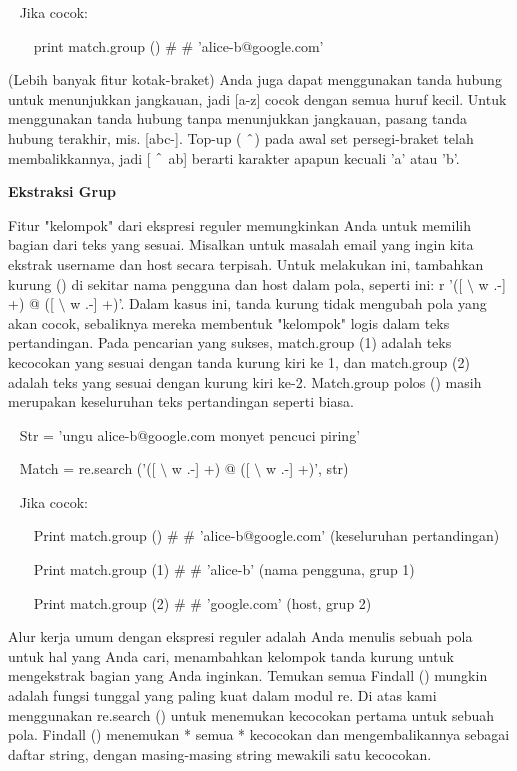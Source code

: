 \begin {enumerate}
\begin {enumerate}
\noindent
~ Jika cocok: \par
\noindent
~~~ print match.group ()  $  \#  $ $  \#  $ 'alice-b@google.com' \par
\vspace{12pt}
(Lebih banyak fitur kotak-braket) Anda juga dapat menggunakan tanda hubung untuk menunjukkan jangkauan, jadi [a-z] cocok dengan semua huruf kecil. Untuk menggunakan tanda hubung tanpa menunjukkan jangkauan, pasang tanda hubung terakhir, mis. [abc-]. Top-up ( $  \string^  $) pada awal set persegi-braket telah membalikkannya, jadi [ $  \string^  $ ab] berarti karakter apapun kecuali 'a' atau 'b'. \par
\vspace{16pt}
{\fontsize{14pt}{14pt}\selectfont \textbf{Ekstraksi Grup} \\} \par
Fitur "kelompok" dari ekspresi reguler memungkinkan Anda untuk memilih bagian dari teks yang sesuai. Misalkan untuk masalah email yang ingin kita ekstrak username dan host secara terpisah. Untuk melakukan ini, tambahkan kurung () di sekitar nama pengguna dan host dalam pola, seperti ini: r '([ $  \setminus  $ w .-] +) @ ([ $  \setminus  $ w .-] +)'. Dalam kasus ini, tanda kurung tidak mengubah pola yang akan cocok, sebaliknya mereka membentuk "kelompok" logis dalam teks pertandingan. Pada pencarian yang sukses, match.group (1) adalah teks kecocokan yang sesuai dengan tanda kurung kiri ke 1, dan match.group (2) adalah teks yang sesuai dengan kurung kiri ke-2. Match.group polos () masih merupakan keseluruhan teks pertandingan seperti biasa. \par
\vspace{12pt}
\noindent
~ Str = 'ungu alice-b@google.com monyet pencuci piring' \par
\noindent
~ Match = re.search ('([ $  \setminus  $ w .-] +) @ ([ $  \setminus  $ w .-] +)', str) \par
\noindent
~ Jika cocok: \par
\noindent
~~~ Print match.group ()  $  \#  $ $  \#  $ 'alice-b@google.com' (keseluruhan pertandingan) \par
\noindent
~~~ Print match.group (1)  $  \#  $ $  \#  $ 'alice-b' (nama pengguna, grup 1) \par
\noindent
~~~ Print match.group (2)  $  \#  $ $  \#  $ 'google.com' (host, grup 2) \par
\vspace{12pt}
Alur kerja umum dengan ekspresi reguler adalah Anda menulis sebuah pola untuk hal yang Anda cari, menambahkan kelompok tanda kurung untuk mengekstrak bagian yang Anda inginkan. Temukan semua Findall () mungkin adalah fungsi tunggal yang paling kuat dalam modul re. Di atas kami menggunakan re.search () untuk menemukan kecocokan pertama untuk sebuah pola. Findall () menemukan * semua * kecocokan dan mengembalikannya sebagai daftar string, dengan masing-masing string mewakili satu kecocokan. \par

\end{enumerate}
\end{enumerate}
